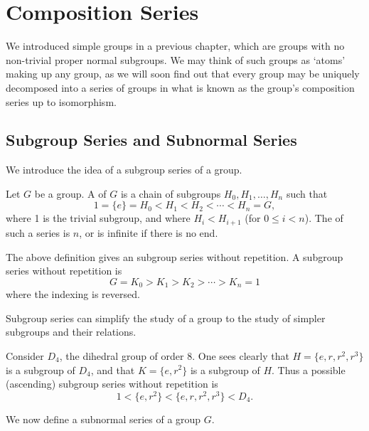 \chapter{Composition Series}
We introduced simple groups in a previous chapter, which are groups with no non-trivial proper normal subgroups. We may think of such groups as `atoms' making up any group, as we will soon find out that every group may be uniquely decomposed into a series of groups in what is known as the group's composition series up to isomorphism.

\section{Subgroup Series and Subnormal Series}
We introduce the idea of a subgroup series of a group.

\begin{definition}
    Let $G$ be a group. A  of $G$ is a chain of subgroups $H_0, H_1, \dots, H_n$ such that
    \[
        1 = \{e\} = H_0 < H_1 < H_2 < \cdots < H_n = G,
    \]
    where 1 is the trivial subgroup, and where $H_i < H_{i+1}$ (for $0 \leq i < n$). The  of such a series is $n$, or is infinite if there is no end.
\end{definition}
\begin{remark}
    The above definition gives an  subgroup series without repetition. A  subgroup series without repetition is
    \[
        G = K_0 > K_1 > K_2 > \cdots > K_n = 1
    \]
    where the indexing is reversed.
\end{remark}

Subgroup series can simplify the study of a group to the study of simpler subgroups and their relations.

\begin{example}
    Consider $D_4$, the dihedral group of order 8. One sees clearly that $H = \{e, r, r^2, r^3\}$ is a subgroup of $D_4$, and that $K = \{e, r^2\}$ is a subgroup of $H$. Thus a possible (ascending) subgroup series without repetition is
    \[
        1 < \{e, r^2\} < \{e, r, r^2, r^3\} < D_4.
    \]
\end{example}

We now define a subnormal series of a group $G$.

